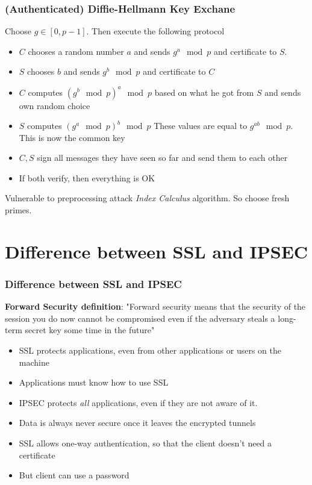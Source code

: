    \begin{frame}
           \frametitle{(Authenticated) Diffie-Hellmann Key Exchane}
            Choose $g \in [0, p-1]$. Then execute the following protocol
            \begin{itemize}
                \item $C$ chooses a random number $a$ and sends $g^a \mod p$ and certificate to $S$. 
                \item $S$ chooses $b$ and sends $g^b \mod p$ and certificate to $C$
                \item $C$ computes $(g^b \mod p)^a \mod p$ based on what he got from $S$ and sends own random choice
                \item $S$ computes $(g^a \mod p)^b \mod p$ These values are equal to $g^{ab} \mod p$. This is now the common key
                \item $C, S$ sign all messages they have seen so far and send them to each other
                \item If both verify, then everything is OK
            \end{itemize}
            Vulnerable to preprocessing attack \textit{Index Calculus} algorithm. So choose fresh primes.
    \end{frame}


\section{Difference between SSL and IPSEC}

    \begin{frame}
        \frametitle{Difference between SSL and IPSEC}
        \textbf{Forward Security definition}: "Forward security means that the security of the session you do now cannot be compromised even if the adversary steals a long-term secret key some time in the future"
        \begin{itemize}
            \item SSL protects applications, even from other applications or users on the machine
            \item Applications must know how to use SSL
            \item IPSEC protects \textit{all} applications, even if they are not aware of it. 
            \item Data is always never secure once it leaves the encrypted tunnels
            \item SSL allows one-way authentication, so that the client doesn't need a certificate
            \item But client can use a password
        \end{itemize}
    \end{frame}

